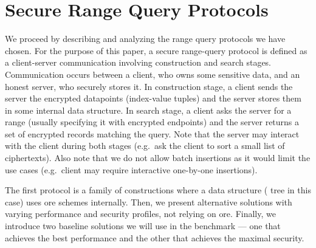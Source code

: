	

	

	

	

	

	

\section{Secure Range Query Protocols}

	We proceed by describing and analyzing the range query protocols we have chosen.
	For the purpose of this paper, a secure range-query protocol is defined as a client-server communication involving construction and search stages.
	Communication occurs between a client, who owns some sensitive data, and an honest server, who securely stores it.
	In construction stage, a client sends the server the encrypted datapoints (index-value tuples) and the server stores them in some internal data structure.
	In search stage, a client asks the server for a range (usually specifying it with encrypted endpoints) and the server returns a set of encrypted records matching the query.
	Note that the server may interact with the client during both stages (e.g.\ ask the client to sort a small list of ciphertexts).
	Also note that we do not allow batch insertions as it would limit the use cases (e.g.\ client may require interactive one-by-one insertions).

	The first protocol is a family of constructions where a data structure ({\BPlus} tree in this case) uses \acrshort{ore} schemes internally.
	Then, we present alternative solutions with varying performance and security profiles, not relying on \acrshort{ore}.
	Finally, we introduce two baseline solutions we will use in the benchmark --- one that achieves the best performance and the other that achieves the maximal security.

	

	

	

	

	

	
